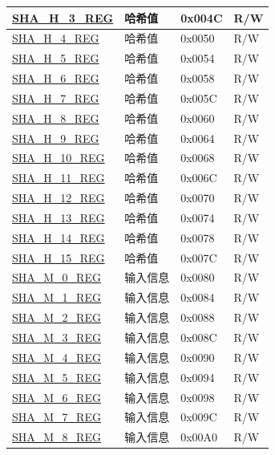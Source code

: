 \begin{longtable}{ | l| p{7.5cm} | p{1.3cm} | p{1cm} | }
\hyperref[regdesc:SHAHNREG]{SHA\_H\_3\_REG} & 哈希值 & 0x004C & R/W \\ \hline
\hyperref[regdesc:SHAHNREG]{SHA\_H\_4\_REG} & 哈希值 & 0x0050 & R/W \\ \hline
\hyperref[regdesc:SHAHNREG]{SHA\_H\_5\_REG} & 哈希值 & 0x0054 & R/W \\ \hline
\hyperref[regdesc:SHAHNREG]{SHA\_H\_6\_REG} & 哈希值 & 0x0058 & R/W \\ \hline
\hyperref[regdesc:SHAHNREG]{SHA\_H\_7\_REG} & 哈希值 & 0x005C & R/W \\ \hline
\hyperref[regdesc:SHAHNREG]{SHA\_H\_8\_REG} & 哈希值 & 0x0060 & R/W \\ \hline
\hyperref[regdesc:SHAHNREG]{SHA\_H\_9\_REG} & 哈希值 & 0x0064 & R/W \\ \hline
\hyperref[regdesc:SHAHNREG]{SHA\_H\_10\_REG} & 哈希值 & 0x0068 & R/W \\ \hline
\hyperref[regdesc:SHAHNREG]{SHA\_H\_11\_REG} & 哈希值 & 0x006C & R/W \\ \hline
\hyperref[regdesc:SHAHNREG]{SHA\_H\_12\_REG} & 哈希值 & 0x0070 & R/W \\ \hline
\hyperref[regdesc:SHAHNREG]{SHA\_H\_13\_REG} & 哈希值 & 0x0074 & R/W \\ \hline
\hyperref[regdesc:SHAHNREG]{SHA\_H\_14\_REG} & 哈希值 & 0x0078 & R/W \\ \hline
\hyperref[regdesc:SHAHNREG]{SHA\_H\_15\_REG} & 哈希值 & 0x007C & R/W \\ \hline
\hyperref[regdesc:SHAMNREG]{SHA\_M\_0\_REG} & 输入信息 & 0x0080 & R/W \\ \hline
\hyperref[regdesc:SHAMNREG]{SHA\_M\_1\_REG} & 输入信息 & 0x0084 & R/W \\ \hline
\hyperref[regdesc:SHAMNREG]{SHA\_M\_2\_REG} & 输入信息 & 0x0088 & R/W \\ \hline
\hyperref[regdesc:SHAMNREG]{SHA\_M\_3\_REG} & 输入信息 & 0x008C & R/W \\ \hline
\hyperref[regdesc:SHAMNREG]{SHA\_M\_4\_REG} & 输入信息 & 0x0090 & R/W \\ \hline
\hyperref[regdesc:SHAMNREG]{SHA\_M\_5\_REG} & 输入信息 & 0x0094 & R/W \\ \hline
\hyperref[regdesc:SHAMNREG]{SHA\_M\_6\_REG} & 输入信息 & 0x0098 & R/W \\ \hline
\hyperref[regdesc:SHAMNREG]{SHA\_M\_7\_REG} & 输入信息 & 0x009C & R/W \\ \hline
\hyperref[regdesc:SHAMNREG]{SHA\_M\_8\_REG} & 输入信息 & 0x00A0 & R/W \\ \hline

\end{longtable}
